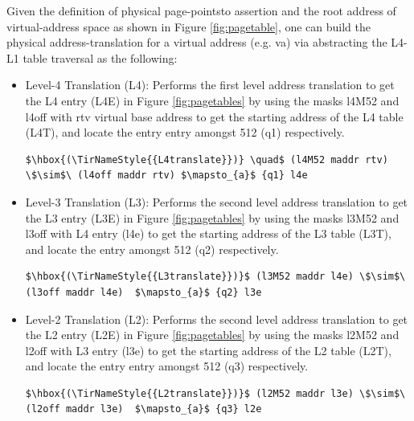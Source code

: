 Given the definition of physical page-pointsto assertion and the root address of virtual-address space as shown in Figure \ref{fig:pagetable}, one can build the physical address-translation for a virtual address (e.g. \textsf{va}) via abstracting the L4-L1 table traversal as the following:
\begin{itemize}
  \item Level-4 Translation (L4): Performs the first level address translation to get the L4 entry (L4E) in Figure \ref{fig:pagetables} by using the masks l4M52 and l4off with \textsf{rtv} virtual base address to get the starting address of the L4 table (L4T), and locate the entry entry amongst 512 (q1) respectively.
    \begin{lstlisting}[language=Coq]
      $\hbox{(\TirNameStyle{{L4translate}})} \quad$ (l4M52 maddr rtv) \$\sim$\ (l4off maddr rtv) $\mapsto_{a}$ {q1} l4e 
    \end{lstlisting}
 \item Level-3 Translation (L3): Performs the second level address translation to get the L3 entry (L3E) in Figure \ref{fig:pagetables} by using the masks l3M52 and l3off with L4 entry (l4e) to get the starting address of the L3 table (L3T), and locate the entry amongst 512 (q2) respectively.
    \begin{lstlisting}[language=Coq]
    $\hbox{(\TirNameStyle{{L3translate}})}$ (l3M52 maddr l4e) \$\sim$\ (l3off maddr l4e)  $\mapsto_{a}$ {q2} l3e
    \end{lstlisting}
  \item Level-2 Translation (L2): Performs the second level address translation to get the L2 entry (L2E) in Figure \ref{fig:pagetables} by using the masks l2M52 and l2off with L3 entry (l3e) to get the starting address of the L2 table (L2T), and locate the entry entry amongst 512 (q3) respectively.
\begin{lstlisting}[language=Coq]
    $\hbox{(\TirNameStyle{{L2translate}})}$ (l2M52 maddr l3e) \$\sim$\ (l2off maddr l3e)  $\mapsto_{a}$ {q3} l2e
    \end{lstlisting}

\end{itemize}
